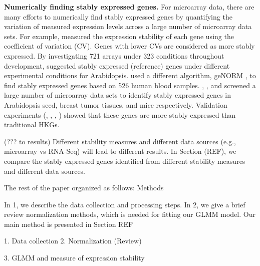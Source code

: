 \documentclass[11pt, a4paper]{article}
\begin{document}
\textbf{Numerically finding stably expressed genes.}
For microarray data, there are many efforts to numerically find stably
expressed genes by quantifying the variation of measured expression levels
across a large number of microarray data sets.  For example,
\cite{czechowski2005genome} measured the expression stability of each gene
using the coefficient of variation (CV). Genes with lower CVs are considered
as more stably expressed.  By investigating 721 arrays under 323 conditions
throughout development, \cite{czechowski2005genome} suggested stably expressed
(reference) genes under different experimental conditions for Arabidopsis.
\cite{stamova2009identification} used a different algorithm, geNORM
\citep{vandesompele2002accurate}, to find stably expressed genes based on 526
human blood samples. 
 \citet{dekkers2012identification}, \citet{gur2009identification}, and
 \citet{frericks2008toolbox} screened a large number of microarray data sets
 to identify stably expressed genes in Arabidopsis seed, breast tumor tissues,
 and mice respectively.
Validation experiments (\cite{czechowski2005genome},
\cite{dekkers2012identification}, \cite{huggett2005real},
\cite{stamova2009identification}) showed that these genes are more stably
expressed than traditional HKGs.  

(??? to results) Different stability measures and different data sources (e.g., microarray vs
RNA-Seq) will lead to different results. In Section (REF), we compare the
stably expressed genes identified from different stability measures and
different data sources.


The rest of the paper organized as follows: 
Methods

In 1, we describe the data collection and processing steps.
In 2, we give a brief review normalization methods, which is needed for
fitting our GLMM model.  Our main method is presented in Section REF 

1. Data collection
2. Normalization
(Review)

3. GLMM and measure of expression stability
\end{document}
